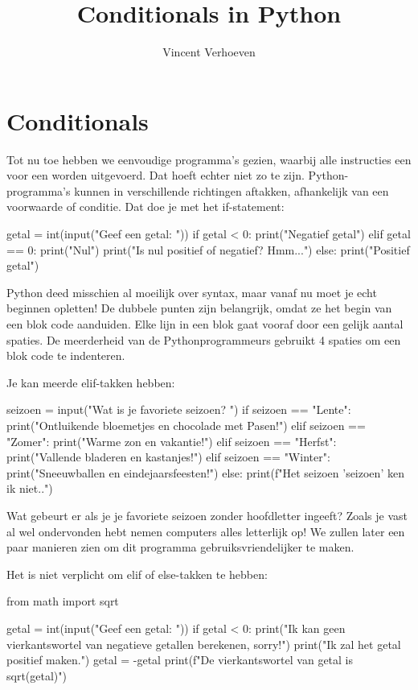 \documentclass[10pt,a4paper]{article}
\author{Vincent Verhoeven}
\title{Conditionals in Python}
\newenvironment{task}{\smallpencil}{}
\begin{document}
\section{Conditionals}
Tot nu toe hebben we eenvoudige programma's gezien, waarbij alle instructies een voor een worden uitgevoerd. Dat hoeft echter niet zo te zijn. Python-programma's kunnen in verschillende richtingen aftakken, afhankelijk van een voorwaarde of conditie. Dat doe je met het if-statement:
\begin{python}
getal = int(input("Geef een getal: "))
if getal < 0:
    print("Negatief getal")
elif getal == 0:
    print("Nul")
    print("Is nul positief of negatief? Hmm...")
else:
    print("Positief getal")
\end{python}

Python deed misschien al moeilijk over syntax, maar vanaf nu moet je echt beginnen opletten! De dubbele punten zijn belangrijk, omdat ze het begin van een blok code aanduiden. Elke lijn in een blok gaat vooraf door een gelijk aantal spaties. De meerderheid van de Pythonprogrammeurs gebruikt 4 spaties om een blok code te indenteren.

Je kan meerde elif-takken hebben:
\begin{python}
seizoen = input("Wat is je favoriete seizoen? ")
if seizoen == "Lente":
    print("Ontluikende bloemetjes en chocolade met Pasen!")
elif seizoen == "Zomer":
    print("Warme zon en vakantie!")
elif seizoen == "Herfst":
    print("Vallende bladeren en kastanjes!")
elif seizoen == "Winter":
    print("Sneeuwballen en eindejaarsfeesten!")
else:
    print(f"Het seizoen '{seizoen}' ken ik niet..")
\end{python}

\begin{task}
Wat gebeurt er als je je favoriete seizoen zonder hoofdletter ingeeft? Zoals je vast al wel ondervonden hebt nemen computers alles letterlijk op! We zullen later een paar manieren zien om dit programma gebruiksvriendelijker te maken.
\end{task}

Het is niet verplicht om elif of else-takken te hebben:
\begin{python}
from math import sqrt

getal = int(input("Geef een getal: "))
if getal < 0:
    print("Ik kan geen vierkantswortel van negatieve getallen berekenen, sorry!")
    print("Ik zal het getal positief maken.")
    getal = -getal
print(f"De vierkantswortel van {getal} is {sqrt(getal)}")
\end{python}
\end{document}
